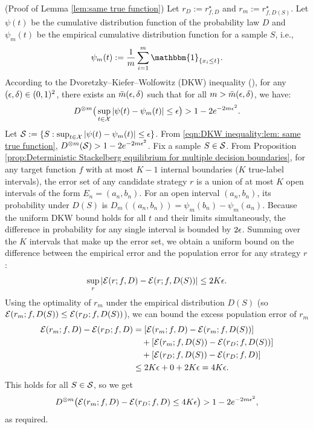 \begin{apdxproof}(Proof of Lemma \ref{lem:same true function})\label{proof:same true function}
Let $r_D := r^\star_{f,D}$ and $r_m := r^\star_{f,D(S)}$. Let $\psi(t)$ be the cumulative distribution function of the probability law $D$ and $\psi_m(t)$ be the empirical cumulative distribution function for a sample $S$, i.e.,
\begin{equation*}
    \psi_m(t) := \frac{1}{m} \sum_{i=1}^m \mathbbm{1}_{\{x_i \leq t\}}.
\end{equation*}
According to the Dvoretzky–Kiefer–Wolfowitz (DKW) inequality (\cite{Dvoretzky-Kiefer-Wolfowitz-1956}), for any $(\epsilon, \delta) \in (0,1)^2$, there exists an $\bar{m}(\epsilon,\delta)$ such that for all $m > \bar{m}(\epsilon,\delta)$, we have:
\begin{equation}\label{eqn:DKW inequality:lem: same true function}
    D^{\otimes m}\big(\sup_{t \in \mathcal{X}} |\psi(t) - \psi_m(t)| \leq \epsilon\big) > 1 - 2e^{-2m\epsilon^2}.
\end{equation}
Let $\mathcal{S} := \{S: \sup_{t \in \mathcal{X}}|\psi(t) - \psi_m(t)| \leq \epsilon\}$. From \eqref{eqn:DKW inequality:lem: same true function}, $D^{\otimes m}(\mathcal{S}) > 1-2e^{-2m\epsilon^2}$. Fix a sample $S \in \mathcal{S}$. 
From Proposition \ref{prop:Deterministic Stackelberg equilibrium for multiple decision boundaries}, for any target function $f$ with at most $K-1$ internal boundaries ($K$ true-label intervals), the error set of any candidate strategy $r$ is a union of at most $K$ open intervals of the form $E_n = (a_n, b_n)$. 
For an open interval $(a_n, b_n)$, its probability under $D(S)$ is $D_m((a_n, b_n)) = \psi_m(b_n) - \psi_m(a_n)$. Because the uniform DKW bound holds for all $t$ and their limits simultaneously, the difference in probability for any single interval is bounded by $2\epsilon$.
Summing over the $K$ intervals that make up the error set, we obtain a uniform bound on the difference between the empirical error and the population error for any strategy $r$:
\begin{equation}\label{eqn:uniform bound K}
    \sup_{r} |\mathcal{E}(r; f, D) - \mathcal{E}(r; f, D(S))| \leq 2K\epsilon.
\end{equation}
Using the optimality of $r_m$ under the empirical distribution $D(S)$ (so $\mathcal{E}(r_m; f, D(S)) \leq \mathcal{E}(r_D; f, D(S))$), we can bound the excess population error of $r_m$
\begin{align*}
    \mathcal{E}(r_m; f, D) - \mathcal{E}(r_D; f, D) &= [\mathcal{E}(r_m; f, D) - \mathcal{E}(r_m; f, D(S))] \\
    &\quad + [\mathcal{E}(r_m; f, D(S)) - \mathcal{E}(r_D; f, D(S))] \\
    &\quad + [\mathcal{E}(r_D; f, D(S)) - \mathcal{E}(r_D; f, D)] \\
    &\leq 2K\epsilon + 0 + 2K\epsilon = 4K\epsilon.
\end{align*}
This holds for all $S \in \mathcal{S}$, so we get
\begin{equation}
    D^{\otimes m}\big(\mathcal{E}(r_m; f, D) - \mathcal{E}(r_D; f, D) \leq 4K\epsilon\big) > 1- 2e^{-2m\epsilon^2},
\end{equation}
as required.
\end{apdxproof}

